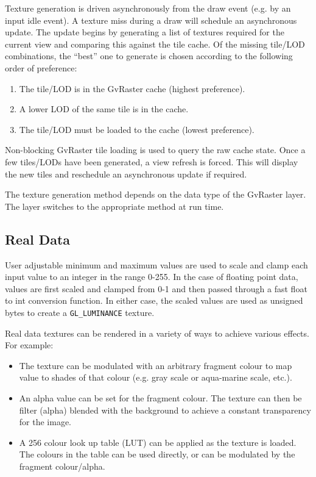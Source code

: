 \documentclass{openevreport}
\begin{document}
Texture generation is driven asynchronously from the draw event
(e.g. by an input idle event).  A texture miss during a draw will
schedule an asynchronous update.  The update begins by generating a
list of textures required for the current view and comparing this
against the tile cache.  Of the missing tile/LOD combinations, the
``best'' one to generate is chosen according to the following order of 
preference:
\begin{enumerate}
\item The tile/LOD is in the GvRaster cache (highest preference).
\item A lower LOD of the same tile is in the cache.
\item The tile/LOD must be loaded to the cache (lowest preference).
\end{enumerate}
Non-blocking GvRaster tile loading is used to query the raw cache
state.  Once a few tiles/LODs have been generated, a view refresh is
forced.  This will display the new tiles and reschedule an asynchronous 
update if required.

The texture generation method depends on the data type of the GvRaster 
layer.  The layer switches to the appropriate method at run time.

\subsection{Real Data}

User adjustable minimum and maximum values are used to scale and clamp
each input value to an integer in the range 0-255.  In the case of
floating point data, values are first scaled and clamped from 0-1 and
then passed through a fast float to int conversion function.  In
either case, the scaled values are used as unsigned bytes to create a
\texttt{GL\_LUMINANCE} texture.

Real data textures can be rendered in a variety of ways to achieve
various effects.  For example:
\begin{itemize}
\item The texture can be modulated with an arbitrary fragment
colour to map value to shades of that colour (e.g. gray scale or
aqua-marine scale, etc.).
\item An alpha value can be set for the fragment colour.  The texture
can then be filter (alpha) blended with the background to achieve a
constant transparency for the image.
\item A 256 colour look up table (LUT) can be applied as the texture
is loaded.  The colours in the table can be used directly, or can be
modulated by the fragment colour/alpha.
\end{itemize}
\end{document}
